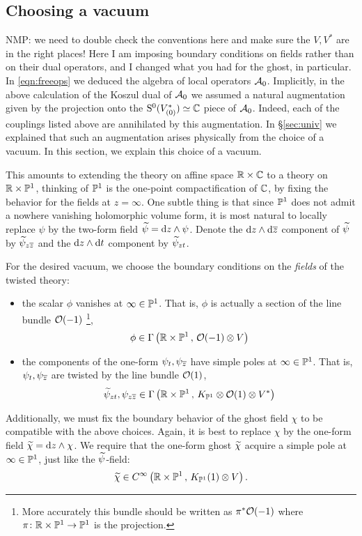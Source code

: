 \documentclass[11pt]{amsart}
\def\natalie#1{{\textcolor{green!65!black}{NMP: {#1}}}}
\begin{document}
\subsection{Choosing a vacuum} 
\natalie{we need to double check the conventions here and make sure the $V, V^*$ are in the right places! Here I am imposing boundary conditions on fields rather than on their dual operators, and I changed what you had for the ghost, in particular.}
In \eqref{eqn:freeops} we deduced the algebra of local operators $\mathcal A_0$. 
Implicitly, in the above calculation of the Koszul dual of $\mathcal A_0$ we assumed a natural augmentation given by the projection onto the ${\rm S}^0(V^*_{(0)})\simeq \mathbb C$ piece of $\mathcal A_0$. 
Indeed, each of the couplings listed above are annihilated by this augmentation. 
In \S \ref{sec:univ} we explained that such an augmentation arises physically from the choice of a vacuum. 
In this section, we explain this choice of a vacuum. 

This amounts to extending the theory on affine space $\mathbb R \times \mathbb C$ to a theory on $\mathbb R \times \mathbb P^1$, thinking of $\mathbb P^1$ is the one-point compactification of $\mathbb C$, by fixing the behavior for the fields at $z = \infty$. 
One subtle thing is that since $\mathbb P^1$ does not admit a nowhere vanishing holomorphic volume form, it is most natural to locally replace $\psi$ by the two-form field $\widetilde \psi = {\rm d} z \wedge \psi$.
Denote the ${\rm d} z  \wedge {\rm d} {\overline{z}}$ component of $\widetilde \psi$ by $\widetilde \psi_{z {\overline{z}}}$ and the ${\rm d} z  \wedge {\rm d} t$ component by $\widetilde \psi_{zt}$. 

For the desired vacuum, we choose the boundary conditions on the \textit{fields} of the twisted theory:
\begin{itemize}
\item the scalar $\phi$ vanishes at $\infty \in \mathbb P^1$. 
That is, $\phi$ is actually a section of the line bundle $\mathcal O(-1)$ \footnote{More accurately this bundle should be written as $\pi^* \mathcal O(-1)$ where $\pi \colon \mathbb R \times \mathbb P^1 \to \mathbb P^1$ is the projection.}, 
\[
\phi \in \Gamma \left(\mathbb R \times \mathbb P^1 \, , \, \mathcal O(-1) \otimes V \right) 
\]
\item the components of the one-form $\psi_{t}, \psi_{{\overline{z}}}$ have simple poles at $\infty \in \mathbb P^1$.
That is, $\psi_t,\psi_{{\overline{z}}}$ are twisted by the line bundle $\mathcal O(1)$,
\[
\widetilde \psi_{zt}, \psi_{z{\overline{z}}}\in \Gamma\left(\mathbb R \times \mathbb P^1 \, , \, K_{\mathbb P^1} \otimes \mathcal O(1) \otimes V^*\right)
\]
\end{itemize}

Additionally, we must fix the boundary behavior of the ghost field $\chi$ to be compatible with the above choices.
Again, it is best to replace $\chi$ by the one-form field $\widetilde \chi = {\rm d} z \wedge \chi$. 
We require that the one-form ghost $\widetilde \chi$ acquire a simple pole at $\infty \in \mathbb P^1$, just like the $\widetilde \psi$-field:
\[
\widetilde\chi \in C^\infty\left(\mathbb R \times \mathbb P^1 \, , \, K_{\mathbb P^1}(1) \otimes V\right) .
\]
\end{document}
